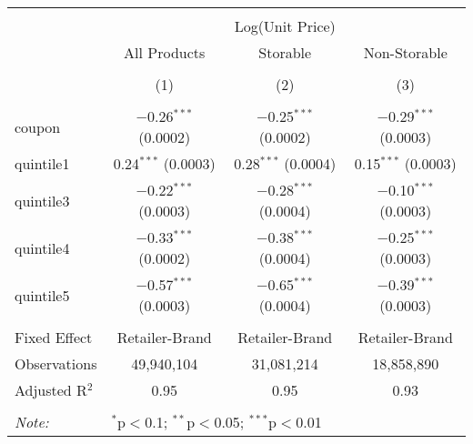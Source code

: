 
\begin{table}[!htbp] \centering 
  \caption{} 
  \label{tab:overallSavings} 
\begin{tabular}{@{\extracolsep{5pt}}lccc} 
\\[-1.8ex]\hline 
\hline \\[-1.8ex] 
 & \multicolumn{3}{c}{Log(Unit Price)} \\ 
\cline{2-4} 
 & All Products & Storable & Non-Storable \\ 
\\[-1.8ex] & (1) & (2) & (3)\\ 
\hline \\[-1.8ex] 
 coupon & $-$0.26$^{***}$ (0.0002) & $-$0.25$^{***}$ (0.0002) & $-$0.29$^{***}$ (0.0003) \\ 
  quintile1 & 0.24$^{***}$ (0.0003) & 0.28$^{***}$ (0.0004) & 0.15$^{***}$ (0.0003) \\ 
  quintile3 & $-$0.22$^{***}$ (0.0003) & $-$0.28$^{***}$ (0.0004) & $-$0.10$^{***}$ (0.0003) \\ 
  quintile4 & $-$0.33$^{***}$ (0.0002) & $-$0.38$^{***}$ (0.0004) & $-$0.25$^{***}$ (0.0003) \\ 
  quintile5 & $-$0.57$^{***}$ (0.0003) & $-$0.65$^{***}$ (0.0004) & $-$0.39$^{***}$ (0.0003) \\ 
 \hline \\[-1.8ex] 
Fixed Effect & Retailer-Brand & Retailer-Brand & Retailer-Brand \\ 
Observations & 49,940,104 & 31,081,214 & 18,858,890 \\ 
Adjusted R$^{2}$ & 0.95 & 0.95 & 0.93 \\ 
\hline 
\hline \\[-1.8ex] 
\textit{Note:}  & \multicolumn{3}{l}{$^{*}$p$<$0.1; $^{**}$p$<$0.05; $^{***}$p$<$0.01} \\ 
\end{tabular} 
\end{table} 
